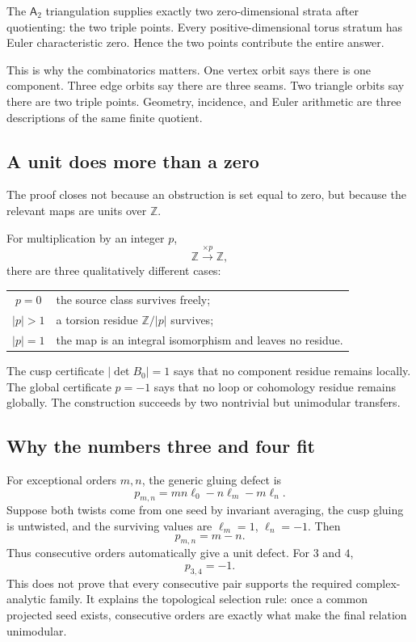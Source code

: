 \documentclass[11pt,reqno]{amsart}
\numberwithin{equation}{section}
\newcommand{\Z}{\mathbb Z}
\newcommand{\Aroot}{\mathsf{A}_2}
\theoremstyle{definition}
\begin{document}
The $\Aroot$ triangulation supplies exactly two zero-dimensional strata after quotienting: the two triple points. Every positive-dimensional torus stratum has Euler characteristic zero. Hence the two points contribute the entire answer.

This is why the combinatorics matters. One vertex orbit says there is one component. Three edge orbits say there are three seams. Two triangle orbits say there are two triple points. Geometry, incidence, and Euler arithmetic are three descriptions of the same finite quotient.

\subsection{A unit does more than a zero}

The proof closes not because an obstruction is set equal to zero, but because the relevant maps are units over $\Z$.

For multiplication by an integer $p$,
\[
\Z\xrightarrow{\times p}\Z,
\]
there are three qualitatively different cases:
\begin{center}
\begin{tabular}{@{}cl@{}}
\toprule
$p=0$ & the source class survives freely;\\
$|p|>1$ & a torsion residue $\Z/|p|$ survives;\\
$|p|=1$ & the map is an integral isomorphism and leaves no residue.\\
\bottomrule
\end{tabular}
\end{center}
The cusp certificate $|\det B_0|=1$ says that no component residue remains locally. The global certificate $p=-1$ says that no loop or cohomology residue remains globally. The construction succeeds by two nontrivial but unimodular transfers.

\subsection{Why the numbers three and four fit}

For exceptional orders $m,n$, the generic gluing defect is
\[
p_{m,n}=mn\ell_0-n\ell_m-m\ell_n.
\]
Suppose both twists come from one seed by invariant averaging, the cusp gluing is untwisted, and the surviving values are $\ell_m=1$, $\ell_n=-1$. Then
\[
p_{m,n}=m-n.
\]
Thus consecutive orders automatically give a unit defect. For $3$ and $4$,
\[
p_{3,4}=-1.
\]
This does not prove that every consecutive pair supports the required complex-analytic family. It explains the topological selection rule: once a common projected seed exists, consecutive orders are exactly what make the final relation unimodular.
\end{document}
